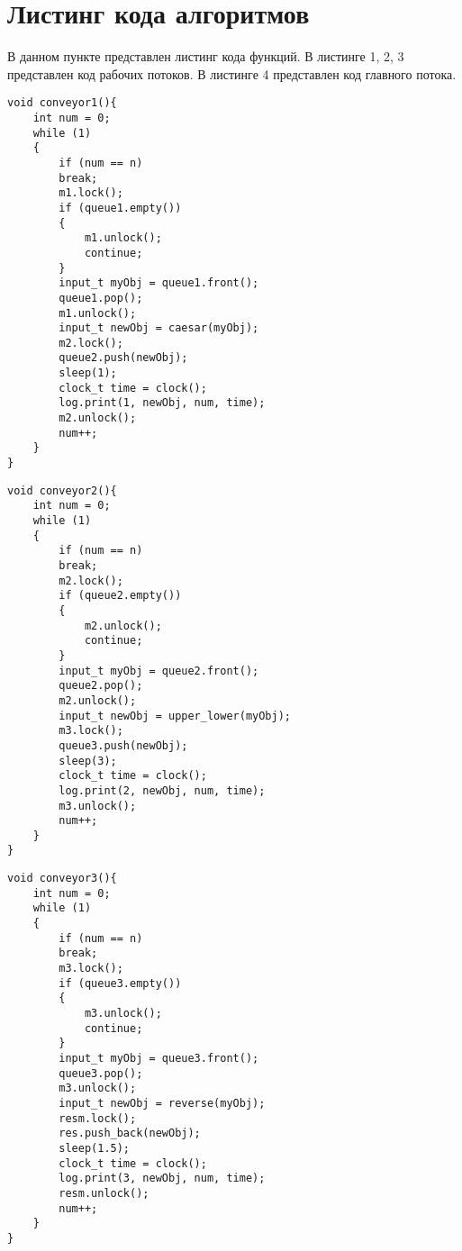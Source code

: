 \section{Листинг кода алгоритмов}
В данном пункте представлен листинг кода функций. В листинге 1, 2, 3 представлен код рабочих потоков. В листинге 4 представлен код главного потока.
\begin{center}
	\captionsetup{justification=raggedright,singlelinecheck=off}
	\begin{lstlisting}[caption = Реализация первого уровня конвейера] 
void conveyor1(){
	int num = 0;
	while (1)
	{
		if (num == n)
		break;
		m1.lock();
		if (queue1.empty())
		{
			m1.unlock();
			continue;
		}
		input_t myObj = queue1.front();
		queue1.pop();
		m1.unlock();
		input_t newObj = caesar(myObj);
		m2.lock();
		queue2.push(newObj);
		sleep(1);
		clock_t time = clock();
		log.print(1, newObj, num, time);
		m2.unlock();
		num++;
	}
}
	\end{lstlisting}
\end{center}
\newpage
\begin{center}
	\captionsetup{justification=raggedright,singlelinecheck=off}
	\begin{lstlisting}[label=brute,caption = Реализация второго уровня конвейера]
void conveyor2(){
	int num = 0;
	while (1)
	{
		if (num == n)
		break;
		m2.lock();
		if (queue2.empty())
		{
			m2.unlock();
			continue;
		}
		input_t myObj = queue2.front();
		queue2.pop();
		m2.unlock();
		input_t newObj = upper_lower(myObj);
		m3.lock();
		queue3.push(newObj);
		sleep(3);
		clock_t time = clock();
		log.print(2, newObj, num, time);
		m3.unlock();
		num++;
	}
}
	\end{lstlisting}
\end{center}
\newpage
\begin{center}
	\captionsetup{justification=raggedright,singlelinecheck=off}
	\begin{lstlisting}[label=brute,caption = Реализация третьего уровня конвейера]
void conveyor3(){
	int num = 0;
	while (1)
	{
		if (num == n)
		break;
		m3.lock();
		if (queue3.empty())
		{
			m3.unlock();
			continue;
		}
		input_t myObj = queue3.front();
		queue3.pop();
		m3.unlock();
		input_t newObj = reverse(myObj);
		resm.lock();
		res.push_back(newObj);
		sleep(1.5);
		clock_t time = clock();
		log.print(3, newObj, num, time);
		resm.unlock();
		num++;
	}
}
	\end{lstlisting}
\end{center}
\newpage
